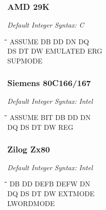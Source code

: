 \subsubsection{AMD 29K}

{\em Default Integer Syntax: C}

{\tt\begin{tabbing}
\hspace{3cm}\=\hspace{3cm}\=\hspace{3cm}\=\hspace{3cm}\=\kill
ASSUME     \> DB          \> DD          \> DN          \> DQ \\
DS         \> DT          \> DW          \> EMULATED    \> ERG \\
SUPMODE \\
\end{tabbing}}

\subsubsection{Siemens 80C166/167}

{\em Default Integer Syntax: Intel}

{\tt\begin{tabbing}
\hspace{3cm}\=\hspace{3cm}\=\hspace{3cm}\=\hspace{3cm}\=\kill
ASSUME     \> BIT         \> DB          \> DD          \> DN \\
DQ         \> DS          \> DT          \> DW          \> REG \\
\end{tabbing}}

\subsubsection{Zilog Zx80}

{\em Default Integer Syntax: Intel}

{\tt\begin{tabbing}
\hspace{3cm}\=\hspace{3cm}\=\hspace{3cm}\=\hspace{3cm}\=\kill
DB         \> DD          \> DEFB        \> DEFW        \> DN \\
DQ         \> DS          \> DT          \> DW          \> EXTMODE \\
LWORDMODE \\
\end{tabbing}}

